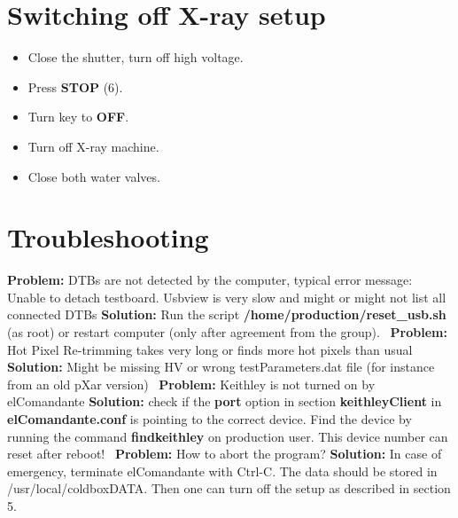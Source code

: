 \documentclass[fleqn,10pt]{SelfArx} %
\newcommand{\prob}[1]{{\textbf{Problem: } #1}\newline}
\newcommand{\sol}[1]{{\textbf{Solution: } #1 \newline \,\newline}}
\begin{document}
\section{Switching off X-ray setup}
\begin{itemize}
\item {Close the shutter, turn off high voltage.}
\item {Press \textbf{STOP} (6).}
\item {Turn key to \textbf{OFF}.}
\item {Turn off X-ray machine.}
\item {Close both water valves.}
\end{itemize}

\section{Troubleshooting}

\prob{DTBs are not detected by the computer, typical error message: Unable to detach testboard. Usbview is very slow and might or might not list all connected DTBs}
\sol{Run the script \textbf{/home/production/reset\_usb.sh} (as root) or restart computer (only after agreement from the group).}
\prob{Hot Pixel Re-trimming takes very long or finds more hot pixels than usual}
\sol{Might be missing HV or wrong testParameters.dat file (for instance from an old pXar version)}
\prob{Keithley is not turned on by elComandante}
\sol{check if the \textbf{port} option in section \textbf{keithleyClient} in \textbf{elComandante.conf} is pointing to the correct device. Find the device by running the command \mbox{\textbf{findkeithley}} on production user. This device number can reset after reboot!}
\prob{How to abort the program?}
\sol{In case of emergency, terminate elComandante with Ctrl-C. The data should be stored in /usr/local/coldboxDATA. Then one can turn off the setup as described in section 5.}











\end{document}
